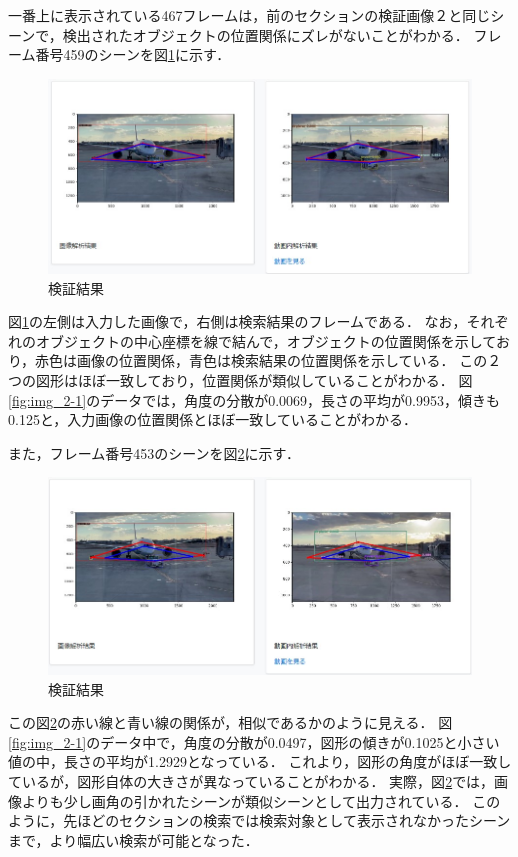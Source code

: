 \documentclass[a4j,12pt,dvipdfmx]{jreport}
\begin{document}
一番上に表示されている467フレームは，前のセクションの検証画像２と同じシーンで，検出されたオブジェクトの位置関係にズレがないことがわかる．
フレーム番号459のシーンを図\ref{fig:img_2-1-2}に示す．

\begin{figure}[b]
  \centering
  \includegraphics[width=13cm]{image/result_2_1_2.jpg}
  \caption{検証結果}
  \label{fig:img_2-1-2}
\end{figure}

図\ref{fig:img_2-1-2}の左側は入力した画像で，右側は検索結果のフレームである．
なお，それぞれのオブジェクトの中心座標を線で結んで，オブジェクトの位置関係を示しており，赤色は画像の位置関係，青色は検索結果の位置関係を示している．
この２つの図形はほぼ一致しており，位置関係が類似していることがわかる．
図\ref{fig:img_2-1}のデータでは，角度の分散が0.0069，長さの平均が0.9953，傾きも0.125と，入力画像の位置関係とほぼ一致していることがわかる．

また，フレーム番号453のシーンを図\ref{fig:img_2-1-3}に示す．

\begin{figure}[b]
  \centering
  \includegraphics[width=13cm]{image/result_2_1_3.jpg}
  \caption{検証結果}
  \label{fig:img_2-1-3}
\end{figure}

この図\ref{fig:img_2-1-3}の赤い線と青い線の関係が，相似であるかのように見える．
図\ref{fig:img_2-1}のデータ中で，角度の分散が0.0497，図形の傾きが0.1025と小さい値の中，長さの平均が1.2929となっている．
これより，図形の角度がほぼ一致しているが，図形自体の大きさが異なっていることがわかる．
実際，図\ref{fig:img_2-1-3}では，画像よりも少し画角の引かれたシーンが類似シーンとして出力されている．
このように，先ほどのセクションの検索では検索対象として表示されなかったシーンまで，より幅広い検索が可能となった．
\end{document}
